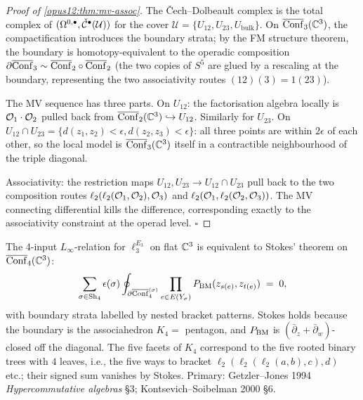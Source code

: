 \begin{proof}[Proof of \ref{opus12:thm:mv-assoc}]
The Čech--Dolbeault complex is the total complex of
$(\Omega^{0,\bullet}, \check{\mathcal{C}}^\bullet(\mathcal U))$ for the cover
$\mathcal U = \{U_{12}, U_{23}, U_{\mathrm{bulk}}\}$. On
$\overline{\mathrm{Conf}}_3(\mathbb{C}^3)$, the compactification introduces the
boundary strata; by the FM structure theorem, the boundary is
homotopy-equivalent to the operadic composition
$\partial\overline{\mathrm{Conf}}_3 \sim \overline{\mathrm{Conf}}_2 \circ
\overline{\mathrm{Conf}}_2$ (the two copies of $S^5$ are glued by a rescaling
at the boundary, representing the two associativity routes
$(12)(3) = 1(23)$).

The MV sequence has three parts. On $U_{12}$: the factorisation
algebra locally is $\mathcal{O}_1 \cdot \mathcal{O}_2$ pulled back from
$\overline{\mathrm{Conf}}_2(\mathbb{C}^3) \hookrightarrow U_{12}$. Similarly for
$U_{23}$. On $U_{12} \cap U_{23} = \{d(z_1, z_2) < \epsilon,
d(z_2, z_3) < \epsilon\}$: all three points are within
$2\epsilon$ of each other, so the local model is
$\overline{\mathrm{Conf}}_3(\mathbb{C}^3)$ itself in a contractible neighbourhood of
the triple diagonal.

Associativity: the restriction maps $U_{12}, U_{23} \to
U_{12} \cap U_{23}$ pull back to the two composition routes
$\ell_2(\ell_2(\mathcal{O}_1, \mathcal{O}_2), \mathcal{O}_3)$ and
$\ell_2(\mathcal{O}_1, \ell_2(\mathcal{O}_2, \mathcal{O}_3))$. The MV connecting
differential kills the difference, corresponding exactly to the
associativity constraint at the operad level. $\square$
\end{proof}

\begin{theorem}\ClaimStatusTheorem
\label{opus12:thm:assoc-stokes}
The 4-input $L_\infty$-relation for $\ell_3^{E_3}$ on flat $\mathbb{C}^3$
is equivalent to Stokes' theorem on
$\overline{\mathrm{Conf}}_4(\mathbb{C}^3)$:
\[
\sum_{\sigma \in \mathrm{Sh}_4} \epsilon(\sigma) \oint_{\partial
\overline{\mathrm{Conf}}_4^{(\sigma)}} \prod_{e \in E(Y_\sigma)}
P_{\mathrm{BM}}(z_{s(e)}, z_{t(e)}) \;=\; 0,
\]
with boundary strata labelled by nested bracket patterns. Stokes
holds because the boundary is the associahedron $K_4 = $ pentagon,
and $P_{\mathrm{BM}}$ is $(\bar\partial_z + \bar\partial_w)$-closed off the
diagonal. The five facets of $K_4$ correspond to the five rooted
binary trees with $4$ leaves, i.e., the five ways to bracket
$\ell_2(\ell_2(\ell_2(a, b), c), d)$ etc.; their signed sum vanishes
by Stokes. Primary: Getzler--Jones 1994 \textit{Hypercommutative algebras}
\S 3; Kontsevich--Soibelman 2000 §6.
\end{theorem}

